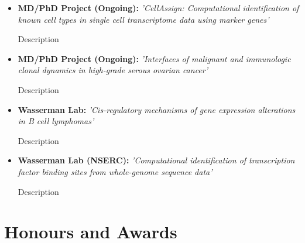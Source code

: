 \documentclass[11pt,a4paper,sans]{moderncv}        %
\begin{document}
\begin{itemize}

\item{\textbf{MD/PhD Project (Ongoing):} \textit{'CellAssign: Computational identification of known cell types in single cell transcriptome data using marker genes'}

\vspace{3pt}

\small{Description}}

\vspace{6pt}

\item{\textbf{MD/PhD Project (Ongoing):} \textit{'Interfaces of malignant and immunologic clonal dynamics in high-grade serous ovarian cancer'}

\vspace{3pt}

\small{Description}}

\vspace{6pt}

\item{\textbf{Wasserman Lab:} \textit{'Cis-regulatory mechanisms of gene expression alterations in B cell lymphomas'}

\vspace{3pt}

\small{Description}}

\vspace{6pt}

\item{\textbf{Wasserman Lab (NSERC):} \textit{'Computational identification of transcription factor binding sites from whole-genome sequence data'}

\vspace{3pt}

\small{Description}}


\end{itemize}

\section{Honours and Awards}
\end{document}
